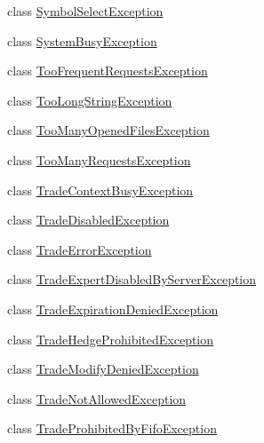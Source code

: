 \begin{DoxyCompactItemize}
\item 
class \hyperlink{class_m_q_l4_c_sharp_1_1_base_1_1_exceptions_1_1_symbol_select_exception}{Symbol\+Select\+Exception}
\item 
class \hyperlink{class_m_q_l4_c_sharp_1_1_base_1_1_exceptions_1_1_system_busy_exception}{System\+Busy\+Exception}
\item 
class \hyperlink{class_m_q_l4_c_sharp_1_1_base_1_1_exceptions_1_1_too_frequent_requests_exception}{Too\+Frequent\+Requests\+Exception}
\item 
class \hyperlink{class_m_q_l4_c_sharp_1_1_base_1_1_exceptions_1_1_too_long_string_exception}{Too\+Long\+String\+Exception}
\item 
class \hyperlink{class_m_q_l4_c_sharp_1_1_base_1_1_exceptions_1_1_too_many_opened_files_exception}{Too\+Many\+Opened\+Files\+Exception}
\item 
class \hyperlink{class_m_q_l4_c_sharp_1_1_base_1_1_exceptions_1_1_too_many_requests_exception}{Too\+Many\+Requests\+Exception}
\item 
class \hyperlink{class_m_q_l4_c_sharp_1_1_base_1_1_exceptions_1_1_trade_context_busy_exception}{Trade\+Context\+Busy\+Exception}
\item 
class \hyperlink{class_m_q_l4_c_sharp_1_1_base_1_1_exceptions_1_1_trade_disabled_exception}{Trade\+Disabled\+Exception}
\item 
class \hyperlink{class_m_q_l4_c_sharp_1_1_base_1_1_exceptions_1_1_trade_error_exception}{Trade\+Error\+Exception}
\item 
class \hyperlink{class_m_q_l4_c_sharp_1_1_base_1_1_exceptions_1_1_trade_expert_disabled_by_server_exception}{Trade\+Expert\+Disabled\+By\+Server\+Exception}
\item 
class \hyperlink{class_m_q_l4_c_sharp_1_1_base_1_1_exceptions_1_1_trade_expiration_denied_exception}{Trade\+Expiration\+Denied\+Exception}
\item 
class \hyperlink{class_m_q_l4_c_sharp_1_1_base_1_1_exceptions_1_1_trade_hedge_prohibited_exception}{Trade\+Hedge\+Prohibited\+Exception}
\item 
class \hyperlink{class_m_q_l4_c_sharp_1_1_base_1_1_exceptions_1_1_trade_modify_denied_exception}{Trade\+Modify\+Denied\+Exception}
\item 
class \hyperlink{class_m_q_l4_c_sharp_1_1_base_1_1_exceptions_1_1_trade_not_allowed_exception}{Trade\+Not\+Allowed\+Exception}
\item 
class \hyperlink{class_m_q_l4_c_sharp_1_1_base_1_1_exceptions_1_1_trade_prohibited_by_fifo_exception}{Trade\+Prohibited\+By\+Fifo\+Exception}

\end{DoxyCompactItemize}
